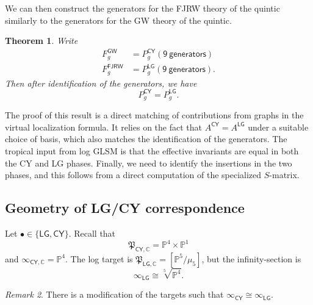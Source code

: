 \documentclass[10pt,oldfontcommands,oneside]{memoir}
\newtheorem{thm}{Theorem}[section]
\theoremstyle{definition}
\theoremstyle{remark}
\newtheorem{rmk}[thm]{Remark}
\theoremstyle{plain}
\theoremstyle{definition}
\theoremstyle{remark}
\newcommand{\C}{\mathbb{C}}
\renewcommand{\P}{\mathbb{P}}
\newcommand{\mf}[1]{\mathfrak{#1}}
\newcommand{\ms}[1]{\mathsf{#1}}
\newcommand{\1}{\mathbf{1}}
\newcommand{\2}{\mathbf{2}}
\newcommand{\3}{\mathbf{3}}
\newcommand{\GW}{\ms{GW}}
\newcommand{\FJRW}{\ms{FJRW}}
\newcommand{\LG}{\ms{LG}}
\newcommand{\CY}{\ms{CY}}
\begin{document}
We can then construct the generators for the FJRW theory of the quintic similarly to the generators for the GW theory of the quintic.
\begin{thm}
    Write
    \begin{align*}
        F_g^{\GW} &= P_g^{\ms{CY}} (\ms{9\ generators}) \\
        F_g^{\FJRW} &= P_g^{\LG}(\ms{9\ generators}).
    \end{align*}
    Then after identification of the generators, we have
    \[ P_g^{\ms{CY}} = P_g^{\LG}. \]
\end{thm}

The proof of this result is a direct matching of contributions from graphs in the virtual localization formula. It relies on the fact that $A^{\ms{CY}} = A^{\ms{LG}}$ under a suitable choice of basis, which also matches the identification of the generators. The tropical input from log GLSM is that the effective invariants are equal in both the CY and LG phases. Finally, we need to identify the insertions in the two phases, and this follows from a direct computation of the specialized $S$-matrix.

\subsection{Geometry of LG/CY correspondence}%
\label{sub:Geometry of LG/CY correspondence}

Let $\bullet \in \{\LG,\CY\}$. Recall that
\[ \mf{P}_{\CY, \C} = \P^4 \times \P^1 \]
and $\infty_{\CY, \C} = \P^4$. The log target is $\mf{P}_{\LG, \C} = [\P^5/\mu_5]$, but the infinity-section is
\[ \infty_{\LG} \cong \sqrt[5]{\P^4}. \]

\begin{rmk}
    There is a modification of the targets such that $\infty_{\CY} \cong \infty_{\LG}$.
\end{rmk}
\end{document}
